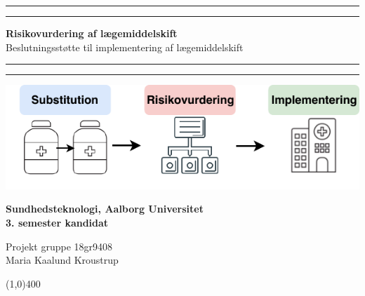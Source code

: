 \clearpage
\thispagestyle{empty}


\begin{center}	
	\rule{\textwidth}{1.6pt}\vspace*{-\baselineskip}\vspace*{2pt} %
	\rule{\textwidth}{0.4pt} %
	
	\vspace{1.2\baselineskip} %
	
	{\Huge \textbf{Risikovurdering af lægemiddelskift}} \\ \vspace{3mm}%
	{\LARGE Beslutningsstøtte til implementering af lægemiddelskift}
	\vspace{1\baselineskip} %
	
	\rule{\textwidth}{0.4pt}\vspace*{-\baselineskip}\vspace{3.2pt} %
	\rule{\textwidth}{1.6pt} %
	
	\vspace{7\baselineskip} %
		\includegraphics[width=1\textwidth]{billeder/forside.pdf} \\
		\vspace{5cm}
	 		\begin{Large}
	 		\textbf{Sundhedsteknologi, Aalborg Universitet  \\ 3. semester kandidat}\\
		\vspace{1cm}
			\end{Large}
	{\Large Projekt gruppe 18gr9408 \\
	Maria Kaalund Kroustrup}
\end{center}
\vspace*{\fill}

\begin{center}
	\line(1,0){400}
\end{center}



